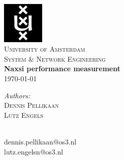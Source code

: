 \documentclass{article}
\begin{document}
\begin{titlepage}
\begin{center}
\includegraphics[width=0.15\textwidth]{images/uva-logo.png}\\[1cm]
\textsc{\LARGE University of Amsterdam}\\[0.5cm]
\textsc{\Large System \& Network Engineering}\\[2cm]
{\huge \bfseries Naxsi performance measurement}\\[0.2cm]
{\large \today}\\
\end{center}

\vfill

\begin{minipage}[t]{0.4\textwidth}
\begin{flushleft} \large
\emph{Authors:}\\
\textsc{Dennis Pellikaan}\\
\textsc{Lutz Engels}\\[1cm]
\end{flushleft}
\end{minipage}
\begin{minipage}[t]{0.4\textwidth}
\begin{flushright} \large
\mbox{ }\\
dennis.pellikaan@os3.nl\\
lutz.engelsn@os3.nl\\
\end{flushright}
\end{minipage}
\end{titlepage}


\newpage
\tableofcontents
\newpage









\appendix



%
\end{document}
